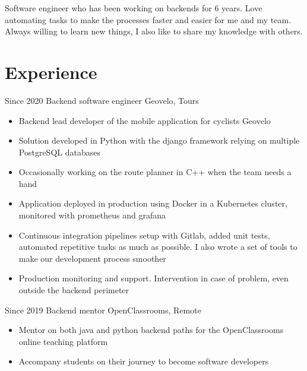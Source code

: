 \documentclass[]{friggeri-cv}
\begin{document}
\begin{center}
Software engineer who has been working on backends for 6 years. Love automating tasks to make the processes faster and easier for me and my team. Always willing to learn new things, I also like to share my knowledge with others.
\end{center}

\vspace{15pt}

\section{Experience}
\vspace{-5pt}
\begin{entrylist}
  \entry
  {Since 2020}
    {Backend software engineer}
    {Geovelo, Tours}
    {
    \vspace{-0.8\baselineskip}
	\begin{itemize}[leftmargin=*]
		\item Backend lead developer of the mobile application for cyclists Geovelo
		\item Solution developed in Python with the django framework relying on multiple PostgreSQL databases
		\item Occasionally working on the route planner in C++ when the team needs a hand
		\item Application deployed in production using Docker in a Kubernetes cluster, monitored with prometheus and grafana
		\item Continuous integration pipelines setup with Gitlab, added unit tests, automated repetitive tasks as much as possible. I also wrote a set of tools to make our development process smoother
		\item Production monitoring and support. Intervention in case of problem, even outside the backend perimeter
	\end{itemize}
	}
	
	\vspace{4pt}
      \entry
    {Since 2019}
    {Backend mentor}
    {OpenClassrooms, Remote}
    {
    \vspace{-0.8\baselineskip}
	\begin{itemize}[leftmargin=*]
		\item Mentor on both java and python backend paths for the OpenClassrooms online teaching platform
		\item Accompany students on their journey to become software developers
	\end{itemize}
	}
	

\end{entrylist}
\end{document}
